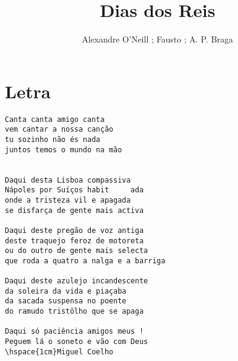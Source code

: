\documentclass{article}
\author{Alexandre O'Neill ; Fausto ; A. P. Braga}
\title{Dias dos Reis}
\begin{document}
\maketitle
\section{Letra}
\begin{verbatim}
Canta canta amigo canta
vem cantar a nossa canção
tu sozinho não és nada
juntos temos o mundo na mão


Daqui desta Lisboa compassiva
Nápoles por Suíços habit     ada
onde a tristeza vil e apagada
se disfarça de gente mais activa

Daqui deste pregão de voz antiga
deste traquejo feroz de motoreta
ou do outro de gente mais selecta
que roda a quatro a nalga e a barriga

Daqui deste azulejo incandescente
da soleira da vida e piaçaba
da sacada suspensa no poente
do ramudo tristôlho que se apaga

Daqui só paciência amigos meus !
Peguem lá o soneto e vão com Deus
\hspace{1cm}Miguel Coelho
\end{verbatim}
\end{document}
